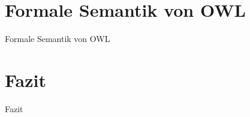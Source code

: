 \documentclass{beamer}
\begin{document}

\section{Formale Semantik von OWL}

\begin{frame}{Formale Semantik von OWL}
\end{frame}


\section{Fazit}
\begin{frame}{Fazit}
\end{frame}
\end{document}
